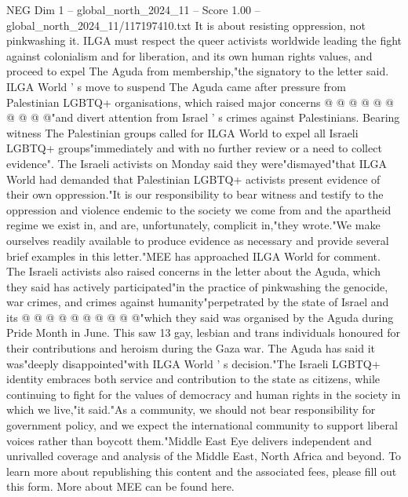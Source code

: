 \begin{textsample}{NEG Dim 1 – global\_north\_2024\_11 – Score 1.00 – global\_north\_2024\_11/117197410.txt}
It is about resisting oppression, not pinkwashing it.
ILGA must respect the queer activists worldwide leading the fight against colonialism and for liberation, and its own human rights values, and proceed to expel The Aguda from membership,"the signatory to the letter said.
ILGA World ' s move to suspend The Aguda came after pressure from Palestinian LGBTQ+ organisations, which raised major concerns @ @ @ @ @ @ @ @ @ @"and divert attention from Israel ' s crimes against Palestinians.
Bearing witness The Palestinian groups called for ILGA World to expel all Israeli LGBTQ+ groups"immediately and with no further review or a need to collect evidence".
The Israeli activists on Monday said they were"dismayed"that ILGA World had demanded that Palestinian LGBTQ+ activists present evidence of their own oppression."It is our responsibility to bear witness and testify to the oppression and violence endemic to the society we come from and the apartheid regime we exist in, and are, unfortunately, complicit in,"they wrote."We make ourselves readily available to produce evidence as necessary and provide several brief examples in this letter."MEE has approached ILGA World for comment.
The Israeli activists also raised concerns in the letter about the Aguda, which they said has actively participated"in the practice of pinkwashing the genocide, war crimes, and crimes against humanity"perpetrated by the state of Israel and its @ @ @ @ @ @ @ @ @ @"which they said was organised by the Aguda during Pride Month in June.
This saw 13 gay, lesbian and trans individuals honoured for their contributions and heroism during the Gaza war.
The Aguda has said it was"deeply disappointed"with ILGA World ' s decision."The Israeli LGBTQ+ identity embraces both service and contribution to the state as citizens, while continuing to fight for the values of democracy and human rights in the society in which we live,"it said."As a community, we should not bear responsibility for government policy, and we expect the international community to support liberal voices rather than boycott them."Middle East Eye delivers independent and unrivalled coverage and analysis of the Middle East, North Africa and beyond.
To learn more about republishing this content and the associated fees, please fill out this form.
More about MEE can be found here.

\end{textsample}
